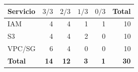 \begin{tabular}{lrrrrr}
\toprule
Servicio & $3/3$ & $2/3$ & $1/3$ & $0/3$ & Total \\
\midrule
IAM & 4 & 4 & 1 & 1 & 10 \\
S3 & 4 & 4 & 2 & 0 & 10 \\
VPC/SG & 6 & 4 & 0 & 0 & 10 \\
\midrule
\textbf{Total} & \textbf{14} & \textbf{12} & \textbf{3} & \textbf{1} & \textbf{30} \\
\bottomrule
\end{tabular}

